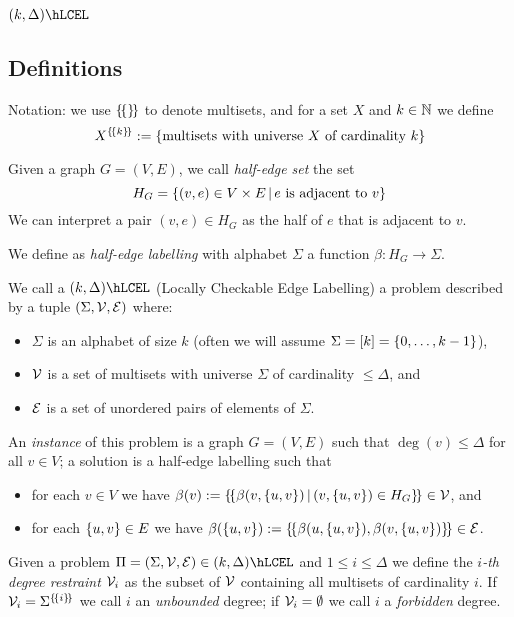 \documentclass[12pt,a4paper]{article}
\begin{document}
\section{\texorpdfstring{$(k,\Delta)\hLCEL$}{k,delta-LCEL}}
\subsection{Definitions}
Notation: we use $\left\lbrace \! \left\lbrace\right\rbrace \! \right\rbrace$ to denote multisets, and for a set $X$ and $k\in\mathbb{N}$ we define
$$X^{\left\lbrace \! \left\lbrace k\right\rbrace \! \right\rbrace}:=\left\{\text{multisets with universe }X\text{ of cardinality }k\right\}$$
\begin{defn}
    Given a graph $G=(V,E)$, we call \emph{half-edge set} the set
    $$H_G=\left\{(v,e)\in V\times E\,\middle|\, e\text{ is adjacent to }v\right\}$$
    We can interpret a pair $(v,e)\in H_G$ as the half of $e$ that is adjacent to $v$.
\end{defn}
\begin{defn}
    We define as \emph{half-edge labelling} with alphabet $\Sigma$ a function $\beta:H_G\to\Sigma$.
\end{defn}
\begin{defn}[$\LCEL$]
    We call a $(k,\Delta)\hLCEL$ (Locally Checkable Edge Labelling) a problem described by a tuple $(\Sigma,\mathcal{V},\mathcal{E})$ where:
    \begin{itemize}
        \item $\Sigma$ is an alphabet of size $k$ (often we will assume $\Sigma=[k]=\left\{0,\ldots,k-1\right\}$),
        \item $\mathcal{V}$ is a set of multisets with universe $\Sigma$ of cardinality $\leq \Delta$, and
        \item $\mathcal{E}$ is a set of unordered pairs of elements of $\Sigma$.
    \end{itemize}
    An \emph{instance} of this problem is a graph $G=(V,E)$ such that $\deg(v)\leq\Delta$ for all $v\in V$; a solution is a half-edge labelling such that
    \begin{itemize}
        \item for each $v\in V$ we have $\beta(v):=\left\lbrace \! \left\lbrace\beta(v,\left\{u,v\right\})\,\middle|\, (v,\left\{u,v\right\})\in H_G\right\rbrace \! \right\rbrace\in\mathcal{V}$, and
        \item for each $\left\{u,v\right\}\in E$ we have $\beta(\left\{u,v\right\}):=\left\lbrace \! \left\lbrace\beta(u,\left\{u,v\right\}),\beta(v,\left\{u,v\right\})\right\rbrace \! \right\rbrace\in\mathcal{E}$.
    \end{itemize}
\end{defn}
\begin{defn}
    Given a problem $\Pi=(\Sigma,\Vc,\Ec)\in(k,\Delta)\hLCEL$ and $1\leq i\leq \Delta$ we define the \emph{$i$-th degree restraint} $\mathcal{V}_i$ as the subset of $\mathcal{V}$ containing all multisets of cardinality $i$. If $\mathcal{V}_i=\Sigma^{\left\lbrace \! \left\lbrace i\right\rbrace \! \right\rbrace}$ we call $i$ an \emph{unbounded} degree; if $\mathcal{V}_i=\emptyset$ we call $i$ a \emph{forbidden} degree.
\end{defn}
\end{document}
